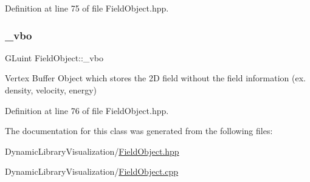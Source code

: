 Definition at line 75 of file Field\+Object.\+hpp.

\mbox{\label{class_field_object_a1203d3948925d7c456ba18af4cb419f7}} 
\subsubsection{\texorpdfstring{\+\_\+vbo}{\_vbo}}
{\footnotesize\ttfamily G\+Luint Field\+Object\+::\+\_\+vbo\hspace{0.3cm}{\ttfamily [protected]}}

Vertex Buffer Object which stores the 2D field without the field information (ex. density, velocity, energy) 

Definition at line 76 of file Field\+Object.\+hpp.



The documentation for this class was generated from the following files\+:\begin{DoxyCompactItemize}
\item 
Dynamic\+Library\+Visualization/\hyperlink{_field_object_8hpp}{Field\+Object.\+hpp}\item 
Dynamic\+Library\+Visualization/\hyperlink{_field_object_8cpp}{Field\+Object.\+cpp}\end{DoxyCompactItemize}
